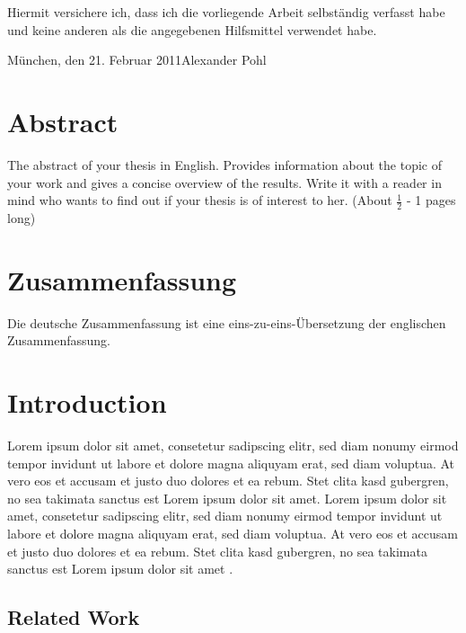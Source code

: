 \documentclass{scrbook}
\newcommand{\studentName}{Alexander Pohl}
\newcommand{\location}{München}
\newcommand{\dateOfHandover}{21. Februar 2011}
\begin{document}
Hiermit versichere ich, dass ich die vorliegende Arbeit selbständig
verfasst habe und keine anderen als die angegebenen Hilfsmittel verwendet
habe.

\vspace*{9em}


\location, den \dateOfHandover \hfill \studentName


\chapter*{Abstract}

The abstract of your thesis in English. Provides information about the topic of your work and gives a concise overview of the results. Write it with a reader in mind who wants to find out if your thesis is of interest to her. (About $\frac{1}{2}$ - 1 pages long)


\chapter*{Zusammenfassung}

Die deutsche Zusammenfassung ist eine eins-zu-eins-Übersetzung der
englischen Zusammenfassung.



\tableofcontents{}



\cleardoublepage
{}


\chapter{Introduction}

Lorem ipsum dolor sit amet, consetetur sadipscing elitr, sed diam
nonumy eirmod tempor invidunt ut labore et dolore magna aliquyam erat,
sed diam voluptua. At vero eos et accusam et justo duo dolores et
ea rebum. Stet clita kasd gubergren, no sea takimata sanctus est Lorem
ipsum dolor sit amet. Lorem ipsum dolor sit amet, consetetur sadipscing
elitr, sed diam nonumy eirmod tempor invidunt ut labore et dolore
magna aliquyam erat, sed diam voluptua. At vero eos et accusam et
justo duo dolores et ea rebum. Stet clita kasd gubergren, no sea takimata
sanctus est Lorem ipsum dolor sit amet \cite{MartinEbner2008,McMillan1986,Yardi2008}.


\section{Related Work}
\end{document}
